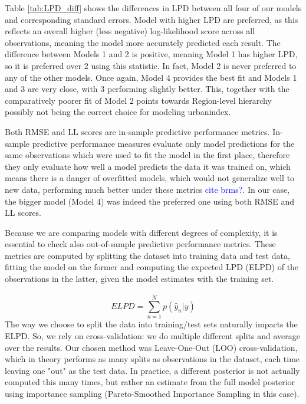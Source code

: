 \documentclass[12pt]{article}
\newcommand{\blue}[1]{\textcolor{blue}{#1}}
\begin{document}
Table \ref{tab:LPD_diff} shows the differences in LPD between all four of our models and corresponding standard errors.
Model with higher LPD are preferred, as this reflects an overall higher (less negative) log-likelihood score across all observations, meaning the model more accurately predicted each result.
The difference between Models 1 and 2 is positive, meaning Model 1 has higher LPD, so it is preferred over 2 using this statistic. In fact, Model 2 is never preferred to any of the other models. Once again, Model 4 provides the best fit and Models 1 and 3 are very close, with 3 performing slightly better. This, together with the comparatively poorer fit of Model 2 points towards Region-level hierarchy possibly not being the correct choice for modeling urbanindex.



Both RMSE and LL scores are in-sample predictive performance metrics. In-sample predictive performance measures evaluate only model predictions for the same observations which were used to fit the model in the first place, therefore they only evaluate how well a model predicts the data it was trained on, which means there is a danger of overfitted models, which would not generalize well to new data, performing much better under these metrics \blue{cite brms?}.
In our case, the bigger model (Model 4) was indeed the preferred one using both RMSE and LL scores.

Because we are comparing models with different degrees of complexity, it is essential to check also out-of-sample predictive performance metrics. These metrics are computed by splitting the dataset into training data and test data, fitting the model on the former and computing the expected LPD (ELPD) of the observations in the latter, given the model estimates with the training set. 

\begin{equation}
	ELPD = \sum_{n= 1}^{\tilde{N}} p(\hat{y}_n | y) 
\end{equation}
The way we choose to split the data into training/test sets naturally impacts the ELPD. So, we rely on cross-validation: we do multiple different splits and average over the results. Our chosen method was Leave-One-Out (LOO) cross-validation, which in theory performs as many splits as observations in the dataset, each time leaving one "out" as the test data. In practice, a different posterior is not actually computed this many times, but rather an estimate from the full model posterior using importance sampling (Pareto-Smoothed Importance Sampling in this case).
\end{document}

